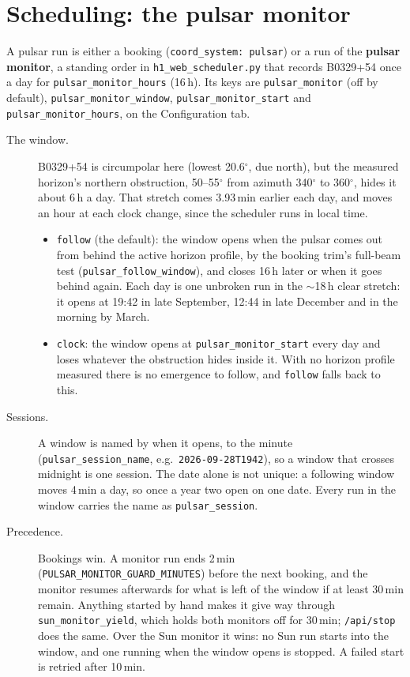 \documentclass[11pt,a4paper]{article}
\newcommand{\code}[1]{\texttt{#1}}
\newcommand{\psr}{B0329+54}
\begin{document}
\section{Scheduling: the pulsar monitor}
\label{sec:monitor}

A pulsar run is either a booking (\code{coord\_system: pulsar}) or a run of the \textbf{pulsar monitor}, a standing order in \code{h1\_web\_scheduler.py} that records \psr{} once a day for \code{pulsar\_monitor\_hours} (16\,h). Its keys are \code{pulsar\_monitor} (off by default), \code{pulsar\_monitor\_window}, \code{pulsar\_monitor\_start} and \code{pulsar\_monitor\_hours}, on the Configuration tab.
\begin{description}
\item[The window.] \psr{} is circumpolar here (lowest 20.6$^\circ$, due north), but the measured horizon's northern obstruction, 50--55$^\circ$ from azimuth 340$^\circ$ to 360$^\circ$, hides it about 6\,h a day. That stretch comes 3.93\,min earlier each day, and moves an hour at each clock change, since the scheduler runs in local time.
  \begin{itemize}
  \item \code{follow} (the default): the window opens when the pulsar comes out from behind the active horizon profile, by the booking trim's full-beam test (\code{pulsar\_follow\_window}), and closes 16\,h later or when it goes behind again. Each day is one unbroken run in the $\sim$18\,h clear stretch: it opens at 19:42 in late September, 12:44 in late December and in the morning by March.
  \item \code{clock}: the window opens at \code{pulsar\_monitor\_start} every day and loses whatever the obstruction hides inside it. With no horizon profile measured there is no emergence to follow, and \code{follow} falls back to this.
  \end{itemize}
\item[Sessions.] A window is named by when it opens, to the minute (\code{pulsar\_session\_name}, e.g.\ \code{2026-09-28T1942}), so a window that crosses midnight is one session. The date alone is not unique: a following window moves 4\,min a day, so once a year two open on one date. Every run in the window carries the name as \code{pulsar\_session}.
\item[Precedence.] Bookings win. A monitor run ends 2\,min (\code{PULSAR\_MONITOR\_GUARD\_MINUTES}) before the next booking, and the monitor resumes afterwards for what is left of the window if at least 30\,min remain. Anything started by hand makes it give way through \code{sun\_monitor\_yield}, which holds both monitors off for 30\,min; \code{/api/stop} does the same. Over the Sun monitor it wins: no Sun run starts into the window, and one running when the window opens is stopped. A failed start is retried after 10\,min.

\end{description}
\end{document}
